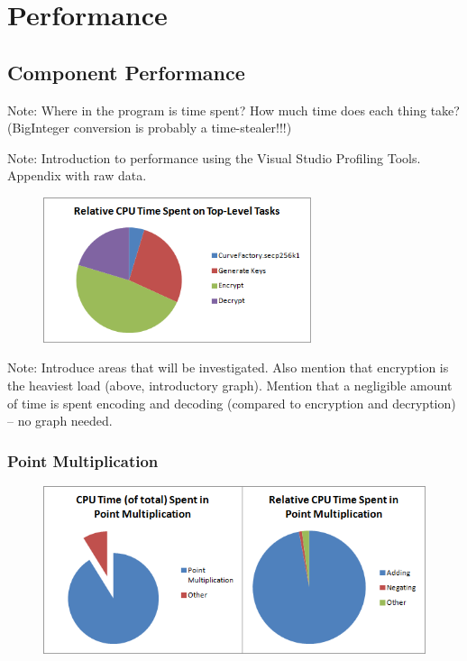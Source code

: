 \section{Performance}
\label{sec:performance}

\subsection{Component Performance}
\label{sec:performance_components}

Note: Where in the program is time spent? How much time does each thing take? (BigInteger conversion is probably
a time-stealer!!!)

Note: Introduction to performance using the Visual Studio Profiling Tools. Appendix with raw data.

\begin{figure}[htb]
	\centering
	\includegraphics[width=0.70\textwidth]{performance/top-level--relative-time}
\end{figure}

Note: Introduce areas that will be investigated. Also mention that encryption is the heaviest load (above, introductory graph). Mention
that a negligible amount of time is spent encoding and decoding (compared to encryption and decryption) -- no graph needed.

\subsubsection{Point Multiplication}
\label{sec:performance_components_multiplication}

\begin{figure}[htb]
	\centering
	\includegraphics[width=1\textwidth]{performance/point-multiplication--relative-time}
\end{figure}

